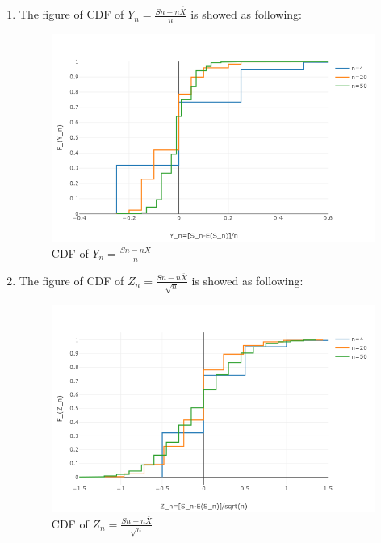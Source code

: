 \documentclass[UTF8]{article}
\begin{document}
\begin{enumerate}
    \item The figure of CDF of $Y_n=\frac{Sn-n\overline{X}}{n}$ is showed as following:
    \begin{figure}[h]
            \centering
            \includegraphics[width=5.0in]{wlln.png}
            \caption{CDF of $Y_n=\frac{Sn-n\overline{X}}{n}$}
            \label{fig:wlln}
        \end{figure}
    \item The figure of CDF of $Z_n=\frac{Sn-n\overline{X}}{\sqrt{n}}$ is showed as following:
    \begin{figure}[h]
            \centering
            \includegraphics[width=5.0in]{clt.png}
            \caption{CDF of $Z_n=\frac{Sn-n\overline{X}}{\sqrt{n}}$}
            \label{fig:clt}       
        \end{figure}
\end{enumerate}

\newpage
\end{document}
